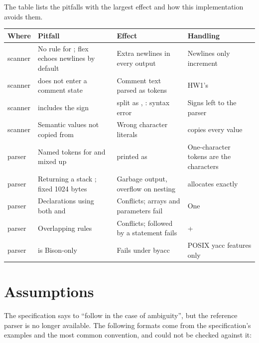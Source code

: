 \documentclass[12pt]{article}
\begin{document}
The table lists the pitfalls with the largest effect and how this implementation avoids them.

\begin{center}
\begin{tabularx}{\linewidth}{@{}lLLL@{}}
\toprule
Where & Pitfall & Effect & Handling \\
\midrule
scanner & No rule for \code{\n}; flex echoes newlines by default & Extra newlines in every output & Newlines only increment  \\
scanner & \code{/*} does not enter a comment state & Comment text parsed as tokens & HW1's  \\
scanner &  includes the sign &  split as , : syntax error & Signs left to the parser \\
scanner & Semantic values not copied from  & Wrong character literals &  copies every value \\
parser & Named tokens for \code{(} and \code{\{} mixed up &  printed as  & One-character tokens are the characters \\
parser & Returning a stack ; fixed 1024 bytes & Garbage output, overflow on nesting &  allocates exactly \\
parser & Declarations using both  and  & Conflicts;  arrays and parameters fail & One  \\
parser & Overlapping  rules & Conflicts;  followed by a statement fails &  +  \\
parser &  is Bison-only & Fails under byacc & POSIX yacc features only \\
\bottomrule
\end{tabularx}
\end{center}

\section{Assumptions}

The specification says to ``follow  in the case of ambiguity'', but the reference
parser is no longer available. The following formats come from the specification's examples and the
most common convention, and could not be checked against it:
\end{document}
